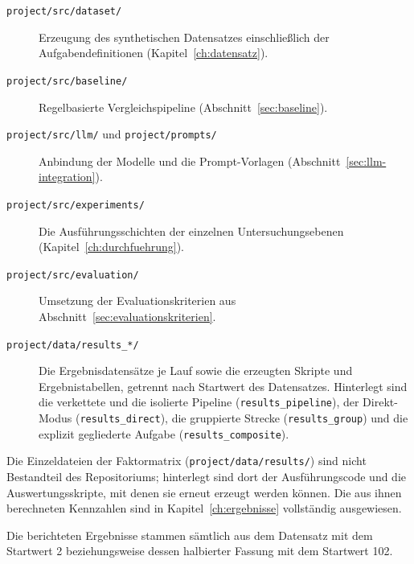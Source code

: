 \begin{description}
    \item[\texttt{project/src/dataset/}] Erzeugung des synthetischen Datensatzes
    einschließlich der Aufgabendefinitionen (Kapitel~\ref{ch:datensatz}).
    \item[\texttt{project/src/baseline/}] Regelbasierte Vergleichspipeline
    (Abschnitt~\ref{sec:baseline}).
    \item[\texttt{project/src/llm/} und \texttt{project/prompts/}] Anbindung der
    Modelle und die Prompt-Vorlagen (Abschnitt~\ref{sec:llm-integration}).
    \item[\texttt{project/src/experiments/}] Die Ausführungsschichten der
    einzelnen Untersuchungsebenen (Kapitel~\ref{ch:durchfuehrung}).
    \item[\texttt{project/src/evaluation/}] Umsetzung der Evaluationskriterien
    aus Abschnitt~\ref{sec:evaluationskriterien}.
    \item[\texttt{project/data/results\_*/}] Die Ergebnisdatensätze je Lauf sowie die erzeugten Skripte und Ergebnistabellen, getrennt nach Startwert des Datensatzes. Hinterlegt sind die verkettete und die isolierte Pipeline (\texttt{results\_pipeline}), der Direkt-Modus (\texttt{results\_direct}), die gruppierte Strecke (\texttt{results\_group}) und die explizit gegliederte Aufgabe (\texttt{results\_composite}).
\end{description}

Die Einzeldateien der Faktormatrix (\texttt{project/data/results/}) sind nicht Bestandteil des Repositoriums; hinterlegt sind dort der Ausführungscode und die Auswertungsskripte, mit denen sie erneut erzeugt werden können. Die aus ihnen berechneten Kennzahlen sind in Kapitel~\ref{ch:ergebnisse} vollständig ausgewiesen.

Die berichteten Ergebnisse stammen sämtlich aus dem Datensatz mit dem Startwert
2 beziehungsweise dessen halbierter Fassung mit dem Startwert 102.
